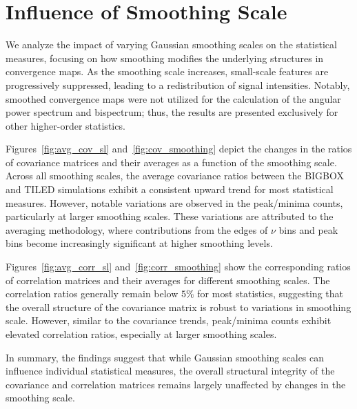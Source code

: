\clearpage

\section{Influence of Smoothing Scale}
We analyze the impact of varying Gaussian smoothing scales on the statistical measures, focusing on how smoothing modifies the underlying structures in convergence maps. As the smoothing scale increases, small-scale features are progressively suppressed, leading to a redistribution of signal intensities. Notably, smoothed convergence maps were not utilized for the calculation of the angular power spectrum and bispectrum; thus, the results are presented exclusively for other higher-order statistics.

Figures~\ref{fig:avg_cov_sl} and~\ref{fig:cov_smoothing} depict the changes in the ratios of covariance matrices and their averages as a function of the smoothing scale. Across all smoothing scales, the average covariance ratios between the BIGBOX and TILED simulations exhibit a consistent upward trend for most statistical measures. However, notable variations are observed in the peak/minima counts, particularly at larger smoothing scales. These variations are attributed to the averaging methodology, where contributions from the edges of $\nu$ bins and peak bins become increasingly significant at higher smoothing levels.

Figures~\ref{fig:avg_corr_sl} and~\ref{fig:corr_smoothing} show the corresponding ratios of correlation matrices and their averages for different smoothing scales. The correlation ratios generally remain below $5\%$ for most statistics, suggesting that the overall structure of the covariance matrix is robust to variations in smoothing scale. However, similar to the covariance trends, peak/minima counts exhibit elevated correlation ratios,  especially at larger smoothing scales.

In summary, the findings suggest that while Gaussian smoothing scales can influence individual statistical measures, the overall structural integrity of the covariance and correlation matrices remains largely unaffected by changes in the smoothing scale.

